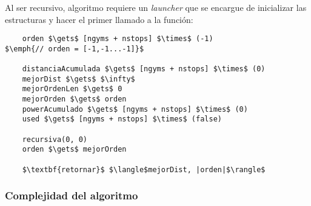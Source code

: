     Al ser recursivo, algoritmo requiere un \emph{launcher} que se encargue de inicializar las estructuras y hacer el primer llamado a la función:

    \begin{lstlisting}
    orden $\gets$ [ngyms + nstops] $\times$ (-1)                $\emph{// orden = [-1,-1...-1]}$

    distanciaAcumulada $\gets$ [ngyms + nstops] $\times$ (0)
    mejorDist $\gets$ $\infty$
    mejorOrdenLen $\gets$ 0
    mejorOrden $\gets$ orden
    powerAcumulado $\gets$ [ngyms + nstops] $\times$ (0)
    used $\gets$ [ngyms + nstops] $\times$ (false)

    recursiva(0, 0)
    orden $\gets$ mejorOrden

    $\textbf{retornar}$ $\langle$mejorDist, |orden|$\rangle$
    \end{lstlisting}

    \subsubsection{Complejidad del algoritmo}
